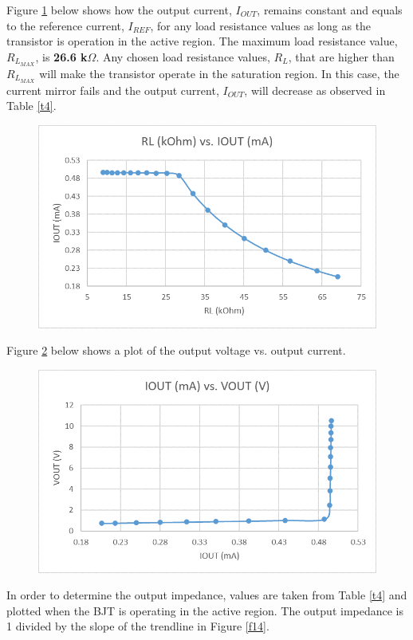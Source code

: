 \documentclass{article}
\begin{document}
	\pagebreak
	
	\noindent Figure \ref{f12} below shows how the output current, $I_{OUT}$, remains constant and equals to the reference current, $I_{REF}$, for any load resistance values as long as the transistor is operation in the active region.
	The maximum load resistance value, $R_{L_{MAX}}$, is \textbf{26.6 k$\Omega$}.
	Any chosen load resistance values, $R_L$, that are higher than $R_{L_{MAX}}$ will make the transistor operate in the saturation region.
	In this case, the current mirror fails and the output current, $I_{OUT}$, will decrease as observed in Table \ref{t4}.
	\begin{figure}[!ht]
		\centering
		\includegraphics[width=0.8\linewidth]{iout_vs_rl_1_1.png}
		\label{f12}
	\end{figure}	

	\noindent Figure \ref{f13} below shows a plot of the output voltage vs. output current.
	\begin{figure}[!ht]
		\centering
		\includegraphics[width=0.8\linewidth]{iout_vs_vout.png}
		\label{f13}
	\end{figure}
	
	\noindent In order to determine the output impedance, values are taken from Table \ref{t4} and plotted when the BJT is operating in the active region.
	The output impedance is 1 divided by the slope of the trendline in Figure \ref{f14}.
	
\end{document}
